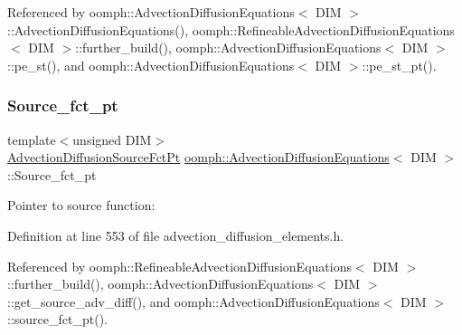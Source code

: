 Referenced by oomph\+::\+Advection\+Diffusion\+Equations$<$ D\+I\+M $>$\+::\+Advection\+Diffusion\+Equations(), oomph\+::\+Refineable\+Advection\+Diffusion\+Equations$<$ D\+I\+M $>$\+::further\+\_\+build(), oomph\+::\+Advection\+Diffusion\+Equations$<$ D\+I\+M $>$\+::pe\+\_\+st(), and oomph\+::\+Advection\+Diffusion\+Equations$<$ D\+I\+M $>$\+::pe\+\_\+st\+\_\+pt().

\mbox{\label{classoomph_1_1AdvectionDiffusionEquations_a7c6a2bebf33ebc0ad7ec2aea03c8804b}} 
\subsubsection{\texorpdfstring{Source\+\_\+fct\+\_\+pt}{Source\_fct\_pt}}
{\footnotesize\ttfamily template$<$unsigned D\+IM$>$ \\
\hyperlink{classoomph_1_1AdvectionDiffusionEquations_aa892578e0cffe209775da9f5ac84bd03}{Advection\+Diffusion\+Source\+Fct\+Pt} \hyperlink{classoomph_1_1AdvectionDiffusionEquations}{oomph\+::\+Advection\+Diffusion\+Equations}$<$ D\+IM $>$\+::Source\+\_\+fct\+\_\+pt\hspace{0.3cm}{\ttfamily [protected]}}



Pointer to source function\+: 



Definition at line 553 of file advection\+\_\+diffusion\+\_\+elements.\+h.



Referenced by oomph\+::\+Refineable\+Advection\+Diffusion\+Equations$<$ D\+I\+M $>$\+::further\+\_\+build(), oomph\+::\+Advection\+Diffusion\+Equations$<$ D\+I\+M $>$\+::get\+\_\+source\+\_\+adv\+\_\+diff(), and oomph\+::\+Advection\+Diffusion\+Equations$<$ D\+I\+M $>$\+::source\+\_\+fct\+\_\+pt().

\mbox{\label{classoomph_1_1AdvectionDiffusionEquations_a9e8d2e67d6d5738f811a40391ceda9aa}} 
